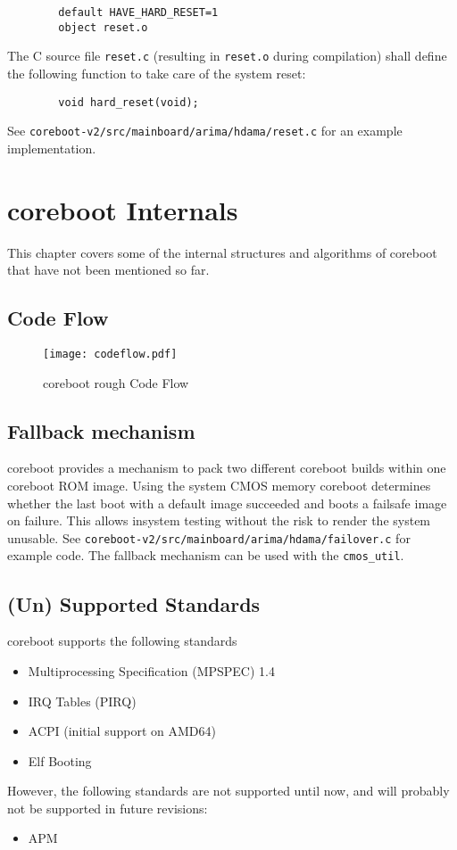 \documentclass[titlepage,12pt]{article}
\begin{document}
\begin{verbatim}
        default HAVE_HARD_RESET=1
        object reset.o
\end{verbatim}

The C source file \texttt{reset.c} (resulting in \texttt{reset.o}
during compilation) shall define the following function to take care 
of the system reset:

\begin{verbatim}
        void hard_reset(void);
\end{verbatim}

See \texttt{coreboot-v2/src/mainboard/arima/hdama/reset.c} for an example
implementation.

\newpage

%
%

\section{coreboot Internals}
This chapter covers some of the internal structures and algorithms of
coreboot that have not been mentioned so far.

\subsection{Code Flow}

\begin{figure}[htb]
\centering
\texttt{[image: codeflow.pdf]}
\caption{coreboot rough Code Flow}
\label{fix:codeflow}
\end{figure}

\newpage

\subsection{Fallback mechanism}
coreboot provides a mechanism to pack two different coreboot builds
within one coreboot ROM image. Using the system CMOS memory coreboot
determines whether the last boot with a default image succeeded and
boots a failsafe image on failure. This allows insystem testing without
the risk to render the system unusable. See
\texttt{coreboot-v2/src/mainboard/arima/hdama/failover.c} for example
code. The fallback mechanism can be used with the \texttt{cmos\_util}.

\subsection{(Un) Supported Standards}
coreboot supports the following standards
\begin{itemize}
\item Multiprocessing Specification (MPSPEC) 1.4
\item IRQ Tables (PIRQ)
\item ACPI (initial support on AMD64)
\item Elf Booting
\end{itemize}
However, the following standards are not supported until now, and will
probably not be supported in future revisions:
\begin{itemize}
\item APM
\end{itemize}
\end{document}
